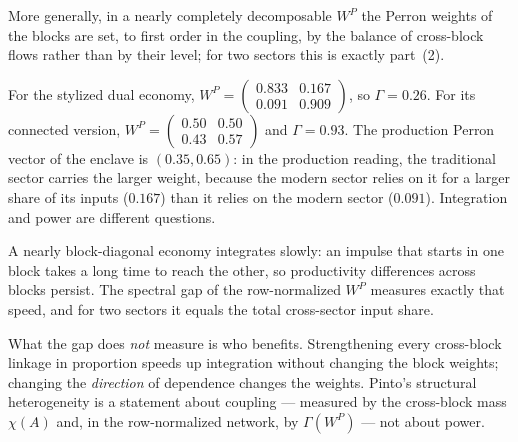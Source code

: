 \documentclass[../structural_economics_book.tex]{subfiles}
\begin{document}
More generally, in a nearly completely decomposable $W^P$ \citep{simon1961aggregation} the Perron weights of the blocks are set, to first order in the coupling, by the balance of cross-block flows rather than by their level; for two sectors this is exactly part~(2).

For the stylized dual economy, $W^P = \begin{pmatrix} 0.833 & 0.167 \\ 0.091 & 0.909\end{pmatrix}$, so $\Gamma = 0.26$. For its connected version, $W^P = \begin{pmatrix} 0.50 & 0.50 \\ 0.43 & 0.57\end{pmatrix}$ and $\Gamma = 0.93$. The production Perron vector of the enclave is $(0.35, 0.65)$: in the production reading, the traditional sector carries the larger weight, because the modern sector relies on it for a larger share of its inputs ($0.167$) than it relies on the modern sector ($0.091$). Integration and power are different questions.

\begin{intuition}
A nearly block-diagonal economy integrates slowly: an impulse that starts in one block takes a long time to reach the other, so productivity differences across blocks persist. The spectral gap of the row-normalized $W^P$ measures exactly that speed, and for two sectors it equals the total cross-sector input share.

What the gap does \textit{not} measure is who benefits. Strengthening every cross-block linkage in proportion speeds up integration without changing the block weights; changing the \textit{direction} of dependence changes the weights. Pinto's structural heterogeneity is a statement about coupling --- measured by the cross-block mass $\chi(A)$ and, in the row-normalized network, by $\Gamma(W^P)$ --- not about power.
\end{intuition}
\end{document}
